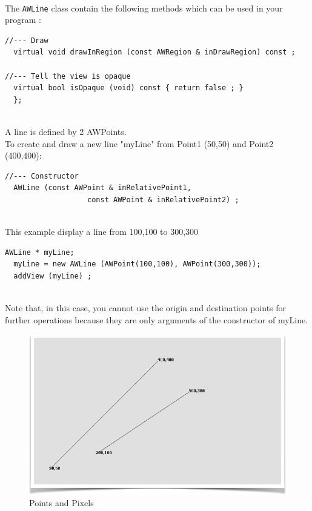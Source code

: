 \documentclass[a4paper,11pt]{extarticle}
\begin{document}
~\\ The \texttt{AWLine} class contain the following methods which can be used in your program :

\begin{lstlisting}[language=Arduinonl]
//--- Draw
  virtual void drawInRegion (const AWRegion & inDrawRegion) const ;

//--- Tell the view is opaque
  virtual bool isOpaque (void) const { return false ; }
  };
 \end{lstlisting}

~\\ A line is defined by 2 AWPoints. 
~\\ To create and draw a new line "myLine" from Point1 (50,50) and Point2 (400,400):

\begin{lstlisting}[language=Arduinonl]
//--- Constructor
  AWLine (const AWPoint & inRelativePoint1,
                   const AWPoint & inRelativePoint2) ;
 \end{lstlisting}

~\\ This example display a line from 100,100 to 300,300

\begin{lstlisting}[language=Arduinonl]
AWLine * myLine;
  myLine = new AWLine (AWPoint(100,100), AWPoint(300,300)); 
  addView (myLine) ;
 \end{lstlisting}
~\\ Note that, in this case, you cannot use the origin and destination points for further operations because they are only arguments of the constructor of myLine.

\begin{figure}[htbp]
   \centering
   \includegraphics[scale=0.7]{AWFig4.png} 
   \caption{Points and Pixels}
   \label{fig:4 }
\end{figure}
\end{document}
